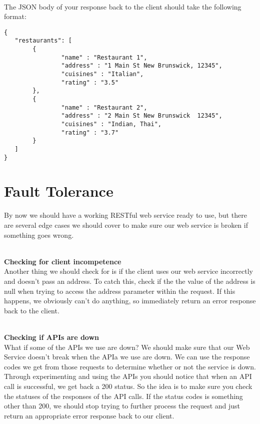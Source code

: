 \documentclass{article}
\begin{document}
\-\ \\
The JSON body of your response back to the client should take the following format:

\begin{verbatim}
{ 
   "restaurants": [
        { 
                "name" : "Restaurant 1",  
                "address" : "1 Main St New Brunswick, 12345", 
                "cuisines" : "Italian", 
                "rating" : "3.5" 
        },
        { 
                "name" : "Restaurant 2", 
                "address" : "2 Main St New Brunswick  12345", 
                "cuisines" : "Indian, Thai", 
                "rating" : "3.7" 
        }
   ]
}
\end{verbatim}



\section{Fault Tolerance}

By now we should have a working RESTful web service ready to use, but there are several edge cases we should cover to make sure our web service is broken if something goes wrong.

\-\ \\
\textbf{Checking for client incompetence} \\
Another thing we should check for is if the client uses our web service incorrectly and doesn't pass an address. To catch this, check if the the value of the address is null when trying to access the address parameter within the request. If this happens, we obviously can't do anything, so immediately return an error response back to the client. 

\-\ \\
\textbf{Checking if APIs are down}\\
What if some of the APIs we use are down? We should make sure that our Web Service doesn't break when the APIa we use are down. We can use the response codes we get from those requests to determine whether or not the service is down. Through experimenting and using the APIs you should notice that when an API call is successful, we get back a 200 status. So the idea is to make sure you check the statuses of the responses of the API calls. If the status codes is something other than 200, we should stop trying to further process the request and just return an appropriate error response back to our client. 
\end{document}
